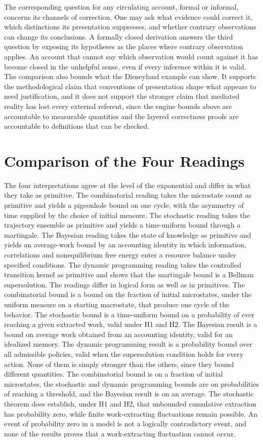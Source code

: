 \documentclass[11pt]{article}
\theoremstyle{definition}
\theoremstyle{remark}
\begin{document}
The corresponding question for any circulating account, formal or informal, concerns its channels of correction. One may ask what evidence could correct it, which distinctions its presentation suppresses, and whether contrary observations can change its conclusions. A formally closed derivation answers the third question by exposing its hypotheses as the places where contrary observation applies. An account that cannot say which observation would count against it has become closed in the unhelpful sense, even if every inference within it is valid. The comparison also bounds what the Disneyland example can show. It supports the methodological claim that conventions of presentation shape what appears to need justification, and it does not support the stronger claim that mediated reality has lost every external referent, since the engine bounds above are accountable to measurable quantities and the layered correctness proofs are accountable to definitions that can be checked.

\section{Comparison of the Four Readings}

The four interpretations agree at the level of the exponential and differ in what they take as primitive. The combinatorial reading takes the microstate count as primitive and yields a pigeonhole bound on one cycle, with the asymmetry of time supplied by the choice of initial measure. The stochastic reading takes the trajectory ensemble as primitive and yields a time-uniform bound through a martingale. The Bayesian reading takes the state of knowledge as primitive and yields an average-work bound by an accounting identity in which information, correlations and nonequilibrium free energy enter a resource balance under specified conditions. The dynamic programming reading takes the controlled transition kernel as primitive and shows that the martingale bound is a Bellman supersolution. The readings differ in logical form as well as in primitives. The combinatorial bound is a bound on the fraction of initial microstates, under the uniform measure on a starting macrostate, that produce one cycle of the behavior. The stochastic bound is a time-uniform bound on a probability of ever reaching a given extracted work, valid under H1 and H2. The Bayesian result is a bound on average work obtained from an accounting identity, valid for an idealized memory. The dynamic programming result is a probability bound over all admissible policies, valid when the supersolution condition holds for every action. None of them is simply stronger than the others, since they bound different quantities. The combinatorial bound is on a fraction of initial microstates, the stochastic and dynamic programming bounds are on probabilities of reaching a threshold, and the Bayesian result is on an average. The stochastic theorem does establish, under H1 and H2, that unbounded cumulative extraction has probability zero, while finite work-extracting fluctuations remain possible. An event of probability zero in a model is not a logically contradictory event, and none of the results proves that a work-extracting fluctuation cannot occur.
\end{document}
